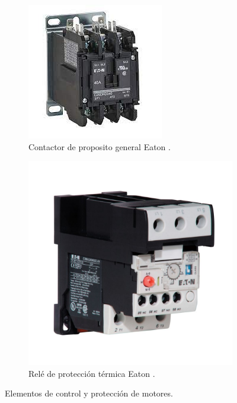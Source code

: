 \begin{figure}
	\centering
	\begin{subfigure}[b]{0.4\textwidth}
		\centering
		\includegraphics[width=\textwidth]{fig/Contactor}
		\caption{Contactor de proposito general Eaton \cite{Eaton1}.}
		\label{fig:contactor}
	\end{subfigure}
\hfill
	\begin{subfigure}[b]{0.4\textwidth}
		\centering
		\includegraphics[width=\textwidth]{fig/relevador}
		\caption{Relé de protección térmica Eaton \cite{Eaton2}.}
		\label{fig:rele}
	\end{subfigure}
\caption{Elementos de control y protección de motores.}
\end{figure}


